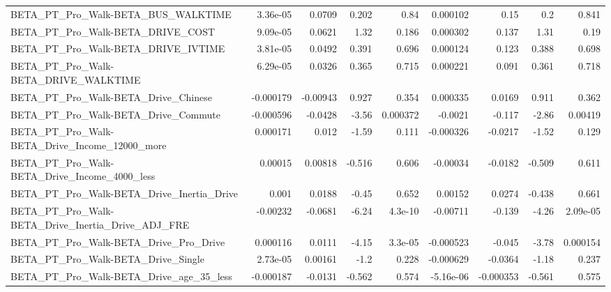 \begin{tabular}{lrrrrrrrr}
BETA\_PT\_Pro\_Walk-BETA\_BUS\_WALKTIME                 &    3.36e-05 &       0.0709 &    0.202 &     0.84 &   0.000102 &        0.15 &          0.2 &         0.841 \\
BETA\_PT\_Pro\_Walk-BETA\_DRIVE\_COST                   &    9.09e-05 &       0.0621 &     1.32 &    0.186 &   0.000302 &       0.137 &         1.31 &          0.19 \\
BETA\_PT\_Pro\_Walk-BETA\_DRIVE\_IVTIME                 &    3.81e-05 &       0.0492 &    0.391 &    0.696 &   0.000124 &       0.123 &        0.388 &         0.698 \\
BETA\_PT\_Pro\_Walk-BETA\_DRIVE\_WALKTIME               &    6.29e-05 &       0.0326 &    0.365 &    0.715 &   0.000221 &       0.091 &        0.361 &         0.718 \\
BETA\_PT\_Pro\_Walk-BETA\_Drive\_Chinese                &   -0.000179 &     -0.00943 &    0.927 &    0.354 &   0.000335 &      0.0169 &        0.911 &         0.362 \\
BETA\_PT\_Pro\_Walk-BETA\_Drive\_Commute                &   -0.000596 &      -0.0428 &    -3.56 & 0.000372 &    -0.0021 &      -0.117 &        -2.86 &       0.00419 \\
BETA\_PT\_Pro\_Walk-BETA\_Drive\_Income\_12000\_more      &    0.000171 &        0.012 &    -1.59 &    0.111 &  -0.000326 &     -0.0217 &        -1.52 &         0.129 \\
BETA\_PT\_Pro\_Walk-BETA\_Drive\_Income\_4000\_less       &     0.00015 &      0.00818 &   -0.516 &    0.606 &   -0.00034 &     -0.0182 &       -0.509 &         0.611 \\
BETA\_PT\_Pro\_Walk-BETA\_Drive\_Inertia\_Drive          &       0.001 &       0.0188 &    -0.45 &    0.652 &    0.00152 &      0.0274 &       -0.438 &         0.661 \\
BETA\_PT\_Pro\_Walk-BETA\_Drive\_Inertia\_Drive\_ADJ\_FRE  &    -0.00232 &      -0.0681 &    -6.24 &  4.3e-10 &   -0.00711 &      -0.139 &        -4.26 &      2.09e-05 \\
BETA\_PT\_Pro\_Walk-BETA\_Drive\_Pro\_Drive              &    0.000116 &       0.0111 &    -4.15 &  3.3e-05 &  -0.000523 &      -0.045 &        -3.78 &      0.000154 \\
BETA\_PT\_Pro\_Walk-BETA\_Drive\_Single                 &    2.73e-05 &      0.00161 &     -1.2 &    0.228 &  -0.000629 &     -0.0364 &        -1.18 &         0.237 \\
BETA\_PT\_Pro\_Walk-BETA\_Drive\_age\_35\_less            &   -0.000187 &      -0.0131 &   -0.562 &    0.574 &  -5.16e-06 &   -0.000353 &       -0.561 &         0.575 \\

\end{tabular}
